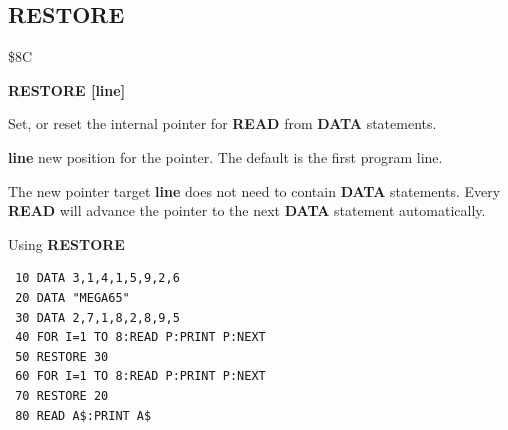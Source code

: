 
\newpage
\subsection{RESTORE}
\begin{description}[leftmargin=2cm,style=nextline]
\item [Token:] \$8C
\item [Format:] {\bf RESTORE [line]}
\item [Usage:]  Set, or reset the internal pointer for
                {\bf READ} from {\bf DATA} statements.

                {\bf line} new position for the
                pointer. The default is the
                first program line.

\item [Remarks:] The new pointer target {\bf line}
                 does not need to contain {\bf DATA} statements.
                 Every {\bf READ} will advance
                 the pointer to the next {\bf DATA} statement automatically.
\item [Example:] Using {\bf RESTORE}

\begin{tcolorbox}[colback=black,coltext=white]
\verbatimfont{\codefont}
\begin{verbatim}
 10 DATA 3,1,4,1,5,9,2,6
 20 DATA "MEGA65"
 30 DATA 2,7,1,8,2,8,9,5
 40 FOR I=1 TO 8:READ P:PRINT P:NEXT
 50 RESTORE 30
 60 FOR I=1 TO 8:READ P:PRINT P:NEXT
 70 RESTORE 20
 80 READ A$:PRINT A$
\end{verbatim}
\end{tcolorbox}
\end{description}


\newpage
